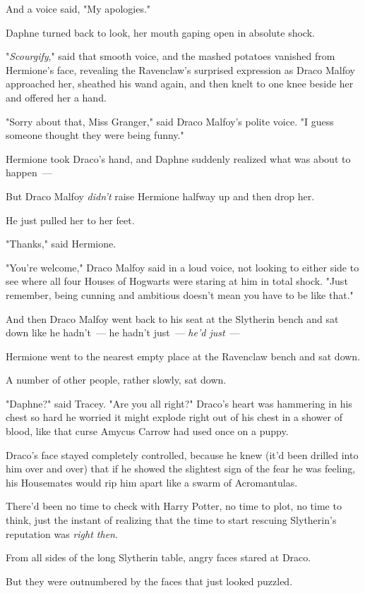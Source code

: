 And a voice said, "My apologies."

Daphne turned back to look, her mouth gaping open in absolute shock.

"\emph{Scourgify}," said that smooth voice, and the mashed potatoes vanished
from Hermione's face, revealing the Ravenclaw's surprised expression as Draco
Malfoy approached her, sheathed his wand again, and then knelt to one knee
beside her and offered her a hand.

"Sorry about that, Miss Granger," said Draco Malfoy's polite voice. "I guess
someone thought they were being funny."

Hermione took Draco's hand, and Daphne suddenly realized what was about to
happen~---

But Draco Malfoy \emph{didn't} raise Hermione halfway up and then drop her.

He just pulled her to her feet.

"Thanks," said Hermione.

"You're welcome," Draco Malfoy said in a loud voice, not looking to either side
to see where all four Houses of Hogwarts were staring at him in total shock.
"Just remember, being cunning and ambitious doesn't mean you have to be like
that."

And then Draco Malfoy went back to his seat at the Slytherin bench and sat down
like he hadn't~--- he hadn't just~--- \emph{he'd just}~---

Hermione went to the nearest empty place at the Ravenclaw bench and sat down.

A number of other people, rather slowly, sat down.

"Daphne?" said Tracey. "Are you all right?"
\sbreak
Draco's heart was hammering in his chest so hard he worried it might explode
right out of his chest in a shower of blood, like that curse Amycus Carrow had
used once on a puppy.

Draco's face stayed completely controlled, because he knew (it'd been drilled
into him over and over) that if he showed the slightest sign of the fear he was
feeling, his Housemates would rip him apart like a swarm of Acromantulas.

There'd been no time to check with Harry Potter, no time to plot, no time to
think, just the instant of realizing that the time to start rescuing
Slytherin's reputation was \emph{right then}.

From all sides of the long Slytherin table, angry faces stared at Draco.

But they were outnumbered by the faces that just looked puzzled.

